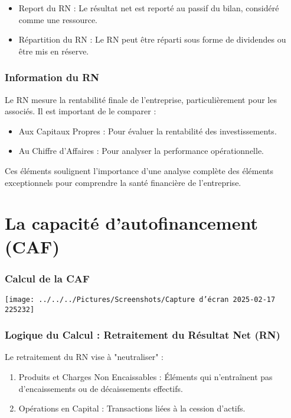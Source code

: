 \documentclass[a4paper, 12pt]{report}
\begin{document}
\begin{itemize}
	\item Report du RN : Le résultat net est reporté au passif du bilan, considéré comme une ressource.
	\item Répartition du RN : Le RN peut être réparti sous forme de dividendes ou être mis en réserve.
\end{itemize}

\subsubsection{Information du RN}

Le RN mesure la rentabilité finale de l'entreprise, particulièrement pour les associés. Il est important de le comparer :

\begin{itemize}
	\item Aux Capitaux Propres : Pour évaluer la rentabilité des investissements.
	\item Au Chiffre d'Affaires : Pour analyser la performance opérationnelle.
\end{itemize}

Ces éléments soulignent l'importance d'une analyse complète des éléments exceptionnels pour comprendre la santé financière de l'entreprise.

\section{La capacité d'autofinancement (CAF)}

\subsubsection{Calcul de la CAF}

\begin{center}
	\texttt{[image: ../../../Pictures/Screenshots/Capture d'écran 2025-02-17 225232]}
\end{center}

\subsubsection{Logique du Calcul : Retraitement du Résultat Net (RN)}

Le retraitement du RN vise à "neutraliser" :

\begin{enumerate}
	\item Produits et Charges Non Encaissables : Éléments qui n'entraînent pas d'encaissements ou de décaissements effectifs.
	\item Opérations en Capital : Transactions liées à la cession d'actifs.
\end{enumerate}
\end{document}
